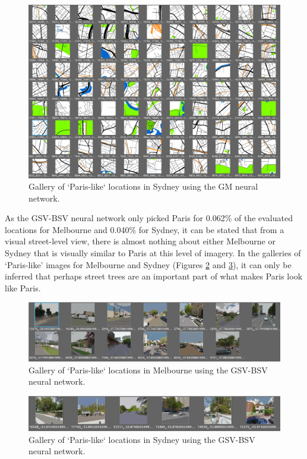 \documentclass[sageh,times]{sagej}
\begin{document}
\begin{figure}[!htbp]
\centering    
\includegraphics[scale=0.50]{Images/SydneyLikeParis/Sydney_maps_gallery.png} 
\caption{Gallery of `Paris-like` locations in Sydney using the GM neural network.}    
 \label{fig:gm_syd_gallery}  
\end{figure} 

As the GSV-BSV neural network only picked Paris for 0.062\% of the evaluated locations for Melbourne and 0.040\% for Sydney, it can be stated that from a visual street-level view, there is almost nothing about either Melbourne or Sydney that is visually similar to Paris at this level of imagery. In the galleries of `Paris-like' images for Melbourne and Sydney (Figures \ref{fig:gsv_mel_gallery} and  \ref{fig:gsv_syd_gallery}), it can only be inferred that perhaps street trees are an important part of what makes Paris look like Paris.

\begin{figure}[!htbp]
\centering    
\includegraphics[scale=0.50]{Images/MelbourneLikeParis/Melbourne_streetview_gallery.png} 
\caption{Gallery of `Paris-like` locations in Melbourne using the GSV-BSV neural network.}    
 \label{fig:gsv_mel_gallery}  
\end{figure} 

\begin{figure}[!htbp]
\centering    
\includegraphics[scale=0.50]{Images/SydneyLikeParis/Sydney_streetview_gallery.png} 
\caption{Gallery of `Paris-like` locations in Sydney using the GSV-BSV neural network.}    
 \label{fig:gsv_syd_gallery}  
\end{figure} 
\end{document}
